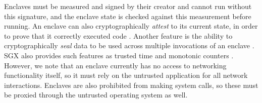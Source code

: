Enclaves must be measured and signed by their creator and cannot run without
this signature, and the enclave state is checked against this measurement
before running.  An enclave can also cryptographically \textit{attest} to its
current state, in order to prove that it correctly executed code
\cite{sgx_provisioning, anati2013innovative}.  Another feature is the ability
to cryptographically \textit{seal} data to be used across multiple invocations
of an enclave \cite{anati2013innovative, sgx_sealing}.  SGX also provides such
features as trusted time and monotonic counters
\cite{sgx_sdk_guide,sgx_trusted_time}.  However, we note that an enclave
currently has no access to networking functionality itself, so it must rely on
the untrusted application for all network interactions.  Enclaves are also
prohibited from making system calls, so these must be proxied through the
untrusted operating system as well.







